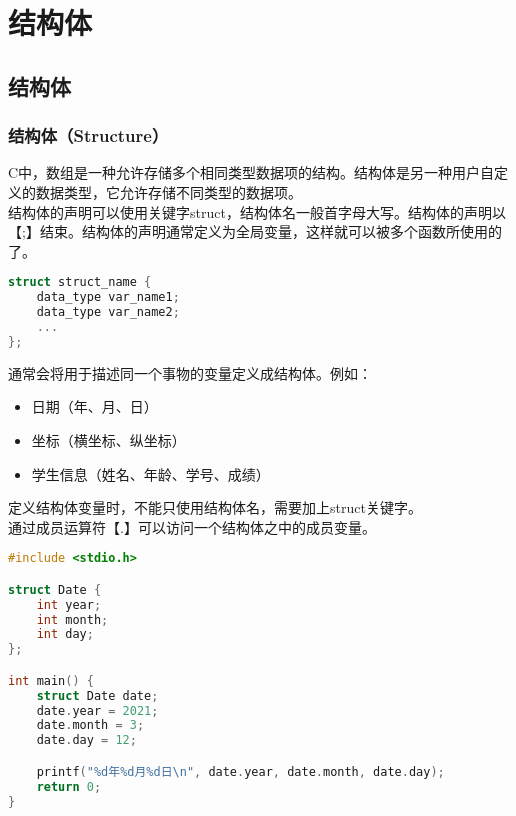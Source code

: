 \chapter{结构体}

\section{结构体}

\subsection{结构体（Structure）}

C中，数组是一种允许存储多个相同类型数据项的结构。结构体是另一种用户自定义的数据类型，它允许存储不同类型的数据项。\\

结构体的声明可以使用关键字struct，结构体名一般首字母大写。结构体的声明以【;】结束。结构体的声明通常定义为全局变量，这样就可以被多个函数所使用的了。

\vspace{-0.5cm}

\begin{lstlisting}[language=C]
struct struct_name {
    data_type var_name1;
    data_type var_name2;
    ...
};
\end{lstlisting}

通常会将用于描述同一个事物的变量定义成结构体。例如：

\begin{itemize}
	\item 日期（年、月、日）
	\item 坐标（横坐标、纵坐标）
	\item 学生信息（姓名、年龄、学号、成绩）
\end{itemize}

定义结构体变量时，不能只使用结构体名，需要加上struct关键字。\\

通过成员运算符【.】可以访问一个结构体之中的成员变量。\\


\begin{lstlisting}[language=C]
#include <stdio.h>

struct Date {
    int year;
    int month;
    int day;
};

int main() {
    struct Date date;
    date.year = 2021;
    date.month = 3;
    date.day = 12;

    printf("%d年%d月%d日\n", date.year, date.month, date.day);
    return 0;
}
\end{lstlisting}

